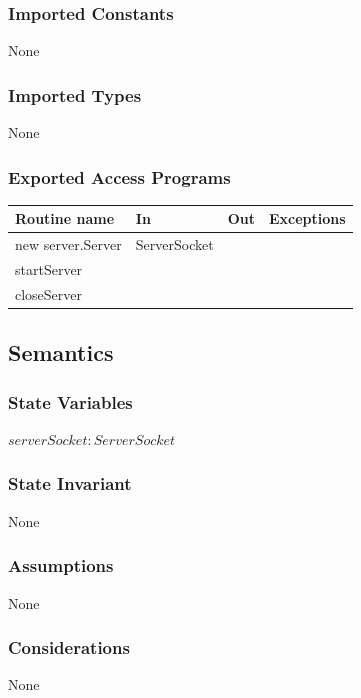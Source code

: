 \documentclass[12pt, titlepage]{article}
\begin{document}
        \subsubsection* {Imported Constants}
            None
        \subsubsection* {Imported Types}
            None
        \subsubsection* {Exported Access Programs}
        
        \begin{tabular}{| l | l | l | p{6cm} |}
            \hline
            \textbf{Routine name} & \textbf{In} & \textbf{Out} & \textbf{Exceptions}\\
            \hline
            new server.Server & ServerSocket &  & \\
            \hline
            startServer &  &  & \\
            \hline 
            closeServer &  &  &\\
            \hline 
        \end{tabular}
        
    \subsection* {Semantics}
    
    \subsubsection* {State Variables}
        $\mathit{serverSocket}: ServerSocket$\\

    \subsubsection* {State Invariant}
        None
    
    \subsubsection* {Assumptions}
        None
    
    \subsubsection* {Considerations}
        None
    
\end{document}
